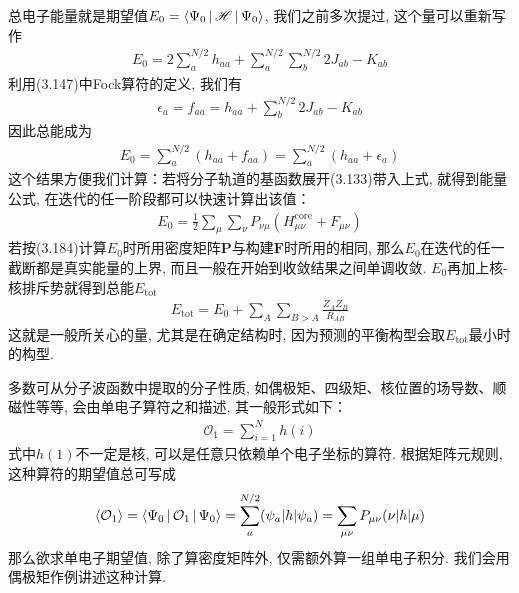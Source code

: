 总电子能量就是期望值$E_0 = \Braket{\Psi_0|\mathscr{H}|\Psi_0}$, 我们之前多次提过, 这个量可以重新写作
\begin{align}
E_0 =2\sum_a^{N/2}h_{aa} + \sum_a^{N/2}\sum_b^{N/2}2J_{ab}-K_{ab}
\end{align}
利用(3.147)中Fock算符的定义, 我们有
\begin{align}
\epsilon_a = f_{aa} = h_{aa} + \sum_b^{N/2}2J_{ab} - K_{ab}
\end{align}
因此总能成为
\begin{align}
E_0 = \sum_{a}^{N/2}(h_{aa}+f_{aa}) = \sum_{a}^{N/2}(h_{aa}+\epsilon_a)
\end{align}
这个结果方便我们计算：若将分子轨道的基函数展开(3.133)带入上式, 就得到能量公式, 在迭代的任一阶段都可以快速计算出该值：
\begin{align}
\label{3.184}
E_0 = \frac{1}{2}\sum_\mu\sum_\nu P_{\nu\mu}(H_{\mu\nu}^\mathrm{core}+F_{\mu\nu})
\end{align}
若按(3.184)计算$E_0$时所用密度矩阵$\mathbf{P}$与构建$\mathbf{F}$时所用的相同, 那么$E_0$在迭代的任一截断都是真实能量的上界, 而且一般在开始到收敛结果之间单调收敛. $E_0$再加上核-核排斥势就得到总能$E_\mathrm{tot}$
\begin{align}
E_\mathrm{tot} = E_0 + \sum_{A}\sum_{B>A}\frac{Z_AZ_B}{R_{AB}}
\end{align}
这就是一般所关心的量, 尤其是在确定结构时, 因为预测的平衡构型会取$E_\mathrm{tot}$最小时的构型.

多数可从分子波函数中提取的分子性质, 如偶极矩、四级矩、核位置的场导数、顺磁性等等, 会由单电子算符之和描述, 其一般形式如下：
\begin{align}
\mathcal{O}_1 = \sum_{i=1}^{N}h(i)
\end{align}
式中$h(1)$不一定是核\ha, 可以是任意只依赖单个电子坐标的算符. 根据矩阵元规则, 这种算符的期望值总可写成
\begin{align}
\Braket{\mathcal{O}_1} = \Braket{\Psi_0|\mathcal{O}_1|\Psi_0} = \sum_{a}^{N/2}(\psi_a|h|\psi_a) = \sum_{\mu\nu}P_{\mu\nu}(\nu|h|\mu)
\end{align}
那么欲求单电子期望值, 除了算密度矩阵外, 仅需额外算一组单电子积分. 我们会用偶极矩作例讲述这种计算. 


